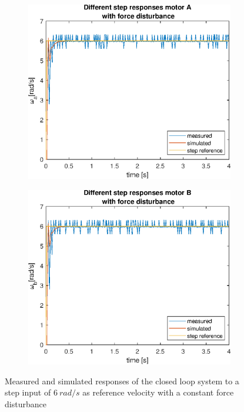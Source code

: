 \documentclass[a4paper,kul]{kulakarticle} %
\begin{document}
\begin{figure}[htp!]
	\centering
	\begin{subfigure}[b]{0.49\textwidth}
		\centering
		\includegraphics[width=\linewidth]{comparison_stepresponseA_FD.eps}
		
	\end{subfigure}
	\hfill
	\begin{subfigure}[b]{0.49\textwidth}  
		\centering
		\includegraphics[width=\linewidth]{comparison_stepresponseB_FD.eps}
		
	\end{subfigure}
	\caption{Measured and simulated responses of the closed loop system to a step input of $\SI{6}{rad/s}$ as reference velocity with a constant force disturbance}
	\label{fig:comparisonstepresponseFD}
\end{figure}
\end{document}

